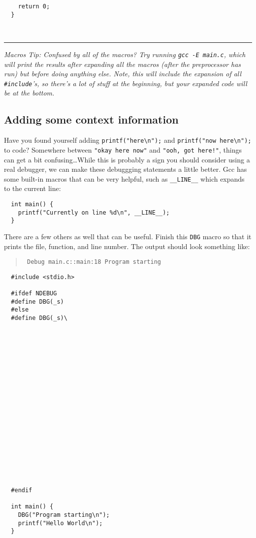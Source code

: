 \documentclass{article}
\begin{document}
\vfill
\texttt{~~~~return 0;\\~~\}}

~

\hrule
\emph{\footnotesize Macros Tip: Confused by all of the macros? Try running
  \texttt{gcc~-E~main.c}, which will print the results after expanding all the
  macros (after the preprocessor has run) but before doing anything else.
  Note, this will include the expansion of all \texttt{\#include}'s, so
  there's a lot of stuff at the beginning, but your expanded code will be at
  the bottom.}

\subsection{Adding some context information}

Have you found yourself adding \texttt{printf("here\textbackslash{n}");} and
\texttt{printf("now~here\textbackslash{n}");} to code? Somewhere between
\texttt{"okay~here~now"} and \texttt{"ooh, got here!"}, things can get a bit
confusing\dots While this is probably a sign you should consider using a real
debugger, we can make these debuggging statements a little better. Gcc has
some built-in macros that can be very helpful, such as \texttt{\_\_LINE\_\_}
which expands to the current line:
\begin{lstlisting}
  int main() {
    printf("Currently on line %d\n", __LINE__);
  }
\end{lstlisting}

There are a few others as well that can be useful. Finish this \texttt{DBG}
macro so that it prints the file, function, and line number. The output should
look something like:

\begin{quote}\tt
  Debug main.c::main:18 Program starting
\end{quote}

\bigskip

\begin{lstlisting}
  #include <stdio.h>

  #ifdef NDEBUG
  #define DBG(_s)
  #else
  #define DBG(_s)\




















  #endif

  int main() {
    DBG("Program starting\n");
    printf("Hello World\n");
  }
\end{lstlisting}
\end{document}
